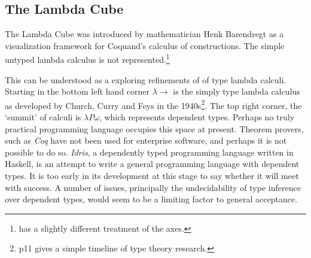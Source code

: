 \documentclass[12pt, a4paper]{report}
\begin{document}
\subsection{The Lambda Cube}
The Lambda Cube was introduced by mathematician Henk Barendregt as a visualization framework for
Coquand's calculus of constructions\cite{Barendregt:1993:LCT:162552.162561}. The simple untyped lambda calculus is not
represented.\footnote{\cite{Pierce:2002:TPL:509043} has a slightly different treatment of the axes.}

\begin{figure}[!h]
    \centering
\end{figure}

This can be understood as a exploring refinements of of type lambda calculi. Starting in the bottom
left hand corner $\lambda \rightarrow$ is the simply type lambda calculus as developed by Church,
Curry and Feys in the 1940s\footnote{\cite{Pierce:2002:TPL:509043} p11 gives a simple timeline of
    type theory research.}. The top right corner, the `summit' of calculi is $\lambda P \omega$, which
represents dependent types. Perhaps no truly practical programming language occupies this space at
present. Theorem provers, such as \textit{Coq} have not been used for enterprise software, and
perhaps it is not possible to do so. \textit{Idris}, a dependently typed programming language
written in Haskell, is an attempt to write a general programming language with dependent types. It is
too early in its development at this stage to say whether it will meet with success. A number of
issues, principally the undecidability of type inference over dependent types, would seem to be a
limiting factor to general acceptance. 
\end{document}
